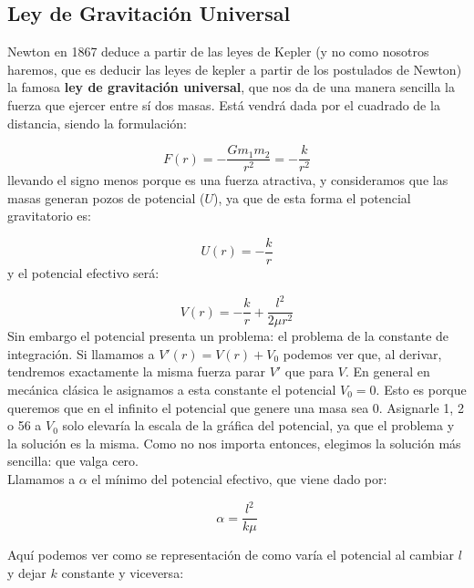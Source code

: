 \documentclass[12pt,a4paper]{book}
\begin{document}
\subsection{Ley de Gravitación Universal}

Newton en 1867 deduce a partir de las leyes de Kepler (y no como nosotros haremos, que es deducir las leyes de kepler a partir de los postulados de Newton) la famosa \textbf{ley de gravitación universal}, que nos da de una manera sencilla la fuerza que ejercer entre sí dos masas. Está vendrá dada por el cuadrado de la distancia, siendo la formulación:

\begin{equation}
F(r) = - \dfrac{G m_1 m_2}{r^2} = - \dfrac{k}{r^2}
\end{equation}
llevando el signo menos porque es una fuerza atractiva, y consideramos que las masas generan pozos de potencial ($U$), ya que de esta forma el potencial gravitatorio es:

\begin{equation}
U(r) = - \dfrac{k}{r}
\end{equation}
y el potencial efectivo será:

\begin{equation}
V(r) = - \dfrac{k}{r} + \dfrac{l^2}{2 \mu r^2}
\end{equation}
Sin embargo el potencial presenta un problema: el problema de la constante de integración. Si llamamos a $V'(r) = V(r) + V_0$ podemos ver que, al derivar, tendremos exactamente la misma fuerza parar $V'$ que para $V$. En general en mecánica clásica le asignamos a esta constante el potencial $V_0 = 0$. Esto es porque queremos que en el infinito el potencial que genere una masa sea 0. Asignarle 1, 2 o 56 a $V_0$ solo elevaría la escala de la gráfica del potencial, ya que el problema y la solución es la misma. Como no nos importa entonces, elegimos la solución más sencilla: que valga cero.\\



Llamamos a $\alpha$ el mínimo del potencial efectivo, que viene dado por:

\begin{equation}
\alpha = \dfrac{l^2}{k \mu}
\end{equation}

Aquí podemos ver como se representación de como varía el potencial al cambiar $l$ y dejar $k$ constante y viceversa:
\end{document}

